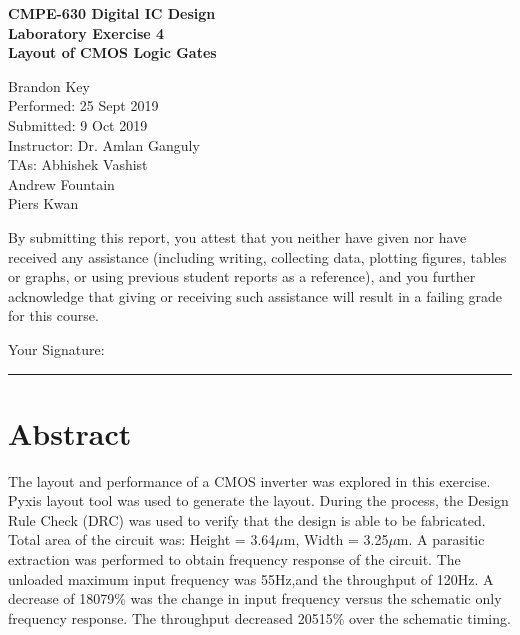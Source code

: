 \documentclass[11pt]{article}
\begin{document}
%
%

\vspace*{2 cm}

\begin{center}
\bf{CMPE-630 Digital IC Design\\
    Laboratory Exercise 4\\
\vspace{0.25 cm}
Layout of CMOS Logic Gates
}
\end{center}

\vspace{6 cm}

\begin{flushright}
Brandon Key\\
Performed: 25 Sept 2019\\
Submitted: 9 Oct 2019\\
\vspace{0.5 cm}
Instructor: Dr. Amlan Ganguly\\
TAs: Abhishek Vashist\\
Andrew Fountain\\
Piers Kwan\\
\vspace{0.5 cm}
\end{flushright}

\vspace{3 cm}
\indent By submitting this report, you attest that you neither have given nor have received any assistance (including writing, collecting data, plotting figures, tables or graphs, or using previous student reports as a reference), and you further acknowledge that giving or receiving such assistance will result in a failing grade for this course.

\vspace{1 cm}
Your Signature:   \rule{13cm}{.1pt}


\tableofcontents
\newpage

\section{Abstract}
	The layout and performance of a CMOS inverter was explored in this exercise. Pyxis layout tool was used to generate the layout. During the process, the Design Rule Check (DRC) was used to verify that the design is able to be fabricated. Total area of the circuit was: Height = 3.64$\mu$m, Width = 3.25$\mu$m. A parasitic extraction was performed to obtain frequency response of the circuit. The unloaded maximum input frequency was 55Hz,and the throughput of 120Hz. A decrease of 18079\% was the change in input frequency versus the schematic only frequency response. The throughput decreased 20515\% over the schematic timing. 
\end{document}
